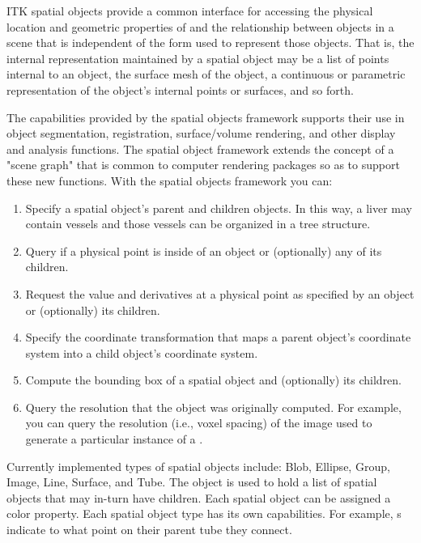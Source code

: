 ITK spatial objects provide a common interface for accessing the physical
location and geometric properties of and the relationship between objects in
a scene that is independent of the form used to represent those objects. That
is, the internal representation maintained by a spatial object may be a list
of points internal to an object, the surface mesh of the object, a continuous
or parametric representation of the object's internal points or surfaces, and
so forth.

The capabilities provided by the spatial objects framework supports their use
in object segmentation, registration, surface/volume rendering, and other
display and analysis functions. The spatial object framework extends the
concept of a "scene graph" that is common to computer rendering packages so
as to support these new functions. With the spatial objects framework you
can:
\begin{enumerate}

        \item Specify a spatial object's parent and children objects.  In
        this way, a liver may contain vessels and those vessels can be
        organized in a tree structure.

        \item Query if a physical point is inside of an object or
        (optionally) any of its children.

        \item Request the value and derivatives at a physical point as
        specified by an object or (optionally) its children.

        \item Specify the coordinate transformation that maps a parent
        object's coordinate system into a child object's coordinate system.

        \item Compute the bounding box of a spatial object and (optionally)
        its children.

        \item Query the resolution that the object was originally
        computed.  For example, you can query the resolution (i.e., voxel
        spacing) of the image used to generate a particular instance of a
        .
\end{enumerate}

Currently implemented types of spatial objects include: Blob, Ellipse, Group,
Image, Line, Surface, and Tube.  The  object is used to hold
a list of spatial objects that may in-turn have children.  Each spatial
object can be assigned a color property.  Each spatial object type has its
own capabilities. For example, s indicate to what
point on their parent tube they connect.

